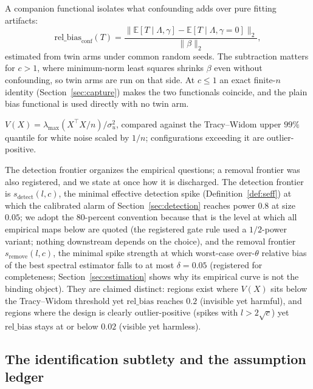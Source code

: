 A companion functional isolates what confounding adds over pure fitting artifacts:
\[
\mathrm{rel\_bias}_{\mathrm{conf}}(T)
= \frac{\bigl\| \mathbb{E}[T \mid \Lambda, \gamma] - \mathbb{E}[T \mid \Lambda, \gamma = 0] \bigr\|_2}{\|\beta\|_2},
\]
estimated from twin arms under common random seeds. The subtraction matters for $c > 1$, where minimum-norm least squares shrinks $\beta$ even without confounding, so twin arms are run on that side. At $c \le 1$ an exact finite-$n$ identity (Section~\ref{sec:capture}) makes the two functionals coincide, and the plain bias functional is used directly with no twin arm.

\begin{definition}
\label{def:visibility}
$V(X) = \lambda_{\max}(X^\top X/n)/\sigma_u^2$, compared against the Tracy--Widom upper $99\%$ quantile for white noise scaled by $1/n$; configurations exceeding it are outlier-positive.
\end{definition}

The detection frontier organizes the empirical questions; a removal frontier was also registered, and we state at once how it is discharged. The detection frontier is $s_{\mathrm{detect}}(l,c)$, the minimal effective detection spike (Definition~\ref{def:seff}) at which the calibrated alarm of Section~\ref{sec:detection} reaches power $0.8$ at size $0.05$; we adopt the 80-percent convention because that is the level at which all empirical maps below are quoted (the registered gate rule used a $1/2$-power variant; nothing downstream depends on the choice), and the removal frontier $s_{\mathrm{remove}}(l,c)$, the minimal spike strength at which worst-case over-$\theta$ relative bias of the best spectral estimator falls to at most $\delta = 0.05$ (registered for completeness; Section~\ref{sec:estimation} shows why its empirical curve is not the binding object). They are claimed distinct: regions exist where $V(X)$ sits below the Tracy--Widom threshold yet $\mathrm{rel\_bias}$ reaches $0.2$ (invisible yet harmful), and regions where the design is clearly outlier-positive (spikes with $l > 2\sqrt{c}$) yet $\mathrm{rel\_bias}$ stays at or below $0.02$ (visible yet harmless).

\subsection{The identification subtlety and the assumption ledger}
\label{subsec:ledger}

